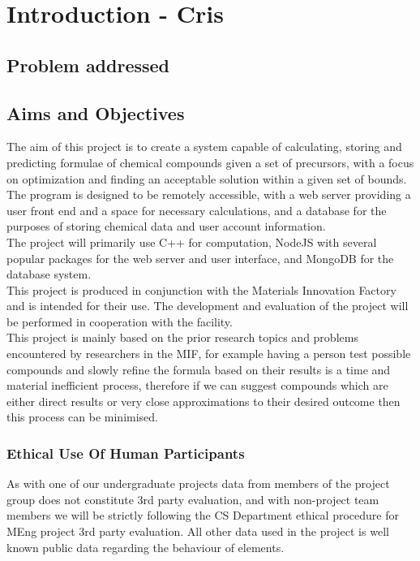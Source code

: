 \chapter{Introduction - Cris}
\label{ch:intro}

\section{Problem addressed}

\section{Aims and Objectives}
The aim of this project is to create a system capable of calculating, storing and predicting formulae of chemical compounds given a set of precursors, with a focus on optimization and finding an acceptable solution within a given set of bounds. The program is designed to be remotely accessible, with a web server providing a user front end and a space for necessary calculations, and a database for the purposes of storing chemical data and user account information. \\

The project will primarily use C++ for computation, NodeJS with several popular packages for the web server and user interface, and MongoDB for the database system. \\

This project is produced in conjunction with the Materials Innovation Factory and is intended for their use. The development and evaluation of the project will be performed in cooperation with the facility. \\

This project is mainly based on the prior research topics and problems encountered by researchers in the MIF, for example having a person test possible compounds and slowly refine the formula based on their results is a time and material inefficient process, therefore if we can suggest compounds which are either direct results or very close approximations to their desired outcome then this process can be minimised. \\

\subsection{Ethical Use Of Human Participants}
As with one of our undergraduate projects data from members of the project group does not constitute 3rd party evaluation, and with non-project team members we will be strictly following the CS Department ethical procedure for MEng project 3rd party evaluation. All other data used in the project is well known public data regarding the behaviour of elements. \\

